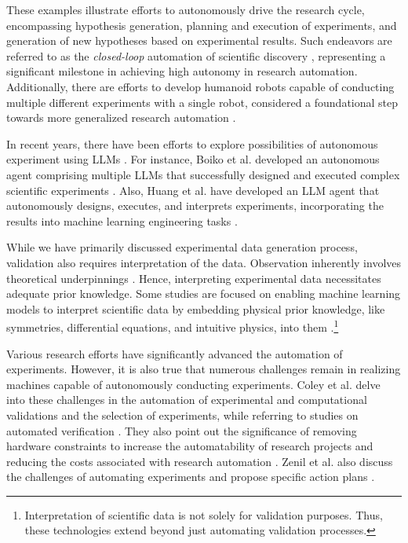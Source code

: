 \documentclass{article}
\begin{document}
These examples illustrate efforts to autonomously drive the research cycle, encompassing hypothesis generation, planning and execution of experiments, and generation of new hypotheses based on experimental results. Such endeavors are referred to as the \textit{closed-loop} automation of scientific discovery \cite{zenil2023future}, representing a significant milestone in achieving high autonomy in research automation. Additionally, there are efforts to develop humanoid robots capable of conducting multiple different experiments with a single robot, considered a foundational step towards more generalized research automation \cite{yachie2017robotic}.

In recent years, there have been efforts to explore possibilities of autonomous experiment using LLMs \cite{boiko2023emergent,qin2023gpt,charness2023generation,huang2023benchmarking}. For instance, Boiko et al. developed an autonomous agent comprising multiple LLMs that successfully designed and executed complex scientific experiments \cite{boiko2023emergent}. Also, Huang et al. have developed an LLM agent that autonomously designs, executes, and interprets experiments, incorporating the results into machine learning engineering tasks \cite{huang2023benchmarking}.

While we have primarily discussed experimental data generation process,  validation also requires interpretation of the data. Observation inherently involves theoretical underpinnings \cite{hanson1965patterns}. Hence, interpreting experimental data necessitates adequate prior knowledge. Some studies are focused on enabling machine learning models to interpret scientific data by embedding physical prior knowledge, like symmetries, differential equations, and intuitive physics, into them \cite{hao2022physics,karniadakis2021physics}.\footnote{
Interpretation of scientific data is not solely for validation purposes. Thus, these technologies extend beyond just automating validation processes.
}

Various research efforts have significantly advanced the automation of experiments. However, it is also true that numerous challenges remain in realizing machines capable of autonomously conducting experiments. Coley et al. delve into these challenges in the automation of experimental and computational validations and the selection of experiments, while referring to studies on automated verification \cite{coley2020autonomousII}. They also point out the significance of removing hardware constraints to increase the automatability of research projects and reducing the costs associated with research automation \cite{coley2020autonomousII}. Zenil et al. also discuss the challenges of automating experiments and propose specific action plans \cite{zenil2023}.
\end{document}
